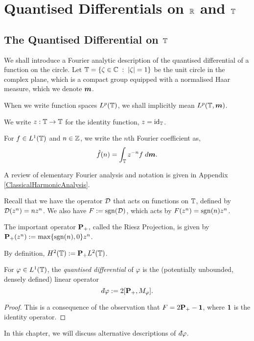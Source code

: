 
\chapter{Quantised Differentials on $\mathbb{R}$ and $\mathbb{T}$} %

\label{QuantisedDifferentialsOnRandT} %



\section{The Quantised Differential on $\mathbb{T}$}
We shall introduce a Fourier analytic description of the quantised differential
of a function on the circle. Let $\mathbb{T} = \{\zeta \in \mathbb{C}\;:\;|\zeta|=1\}$
be the unit circle in the complex plane, which is a compact group
equipped with a normalised Haar measure, which we denote $\boldsymbol{m}$.

When we write function spaces $L^p(\mathbb{T})$, we shall
implicitly mean $L^p(\mathbb{T},\boldsymbol{m})$.

We write $z:\mathbb{T}\to\mathbb{T}$ for the identity function, $z = \operatorname{id}_{\mathbb{T}}$.

For $f \in L^1(\mathbb{T})$ and $n \in \mathbb{Z}$, we write the $n$th Fourier coefficient as,
\begin{equation}
    \hat{f}(n) = \int_{\mathbb{T}} z^{-n}f\;d\boldsymbol{m}.
\end{equation}

A review of elementary Fourier analysis and
notation is given in Appendix \ref{ClassicalHarmonicAnalysis}.

Recall that we have the operator $\mathcal{D}$ that acts on functions on $\mathbb{T}$, defined
by $\mathcal{D}(z^n) = nz^n$. We also have $F := \operatorname{sgn}(\mathcal{D})$, which acts by $F(z^n) = \operatorname{sgn}(n)z^n$.

The important operator $\mathbf{P}_+$, called the Riesz Projection, is given by $\mathbf{P}_+(z^n) := \max\{\operatorname{sgn}(n),0\}z^n$.

By definition, $H^2(\mathbb{T}) := \mathbf{P}_+L^2(\mathbb{T})$.

\begin{proposition}
    For $\varphi \in L^1(\mathbb{T})$, the \emph{quantised differential} of $\varphi$ is the (potentially unbounded, densely defined) linear operator
    \begin{equation}
        \qd\varphi := 2[\Proj_+,M_\varphi].
    \end{equation}
\end{proposition}
\begin{proof}
    This is a consequence of the observation that $F = 2\mathbf{P}_+-\mathbf{1}$,
    where $\mathbf{1}$ is the identity operator.
\end{proof}
In this chapter, we will discuss alternative descriptions of $\qd \varphi$.

